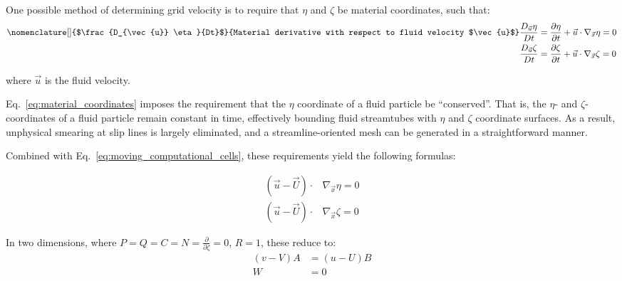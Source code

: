 \documentclass[12pt,letterpaper]{article}
\begin{document}

One possible method of determining grid velocity is to require that
$\eta$ and $\zeta$ be material coordinates, such that:
\begin{align}
\nomenclature[]{$\frac{D_{\vec{u}} \eta}{Dt}$}{Material derivative with
  respect to fluid velocity $\vec{u}$}
\label{eq:material_coordinates}
\frac{D_{\vec{u}} \eta}{Dt}&=\frac{\partial \eta} {\partial t} +
\vec{u}\cdot\nabla_{\vec{x}}\eta
=0
\\
\frac{D_{\vec{u}} \zeta}{Dt}&=\frac{\partial \zeta} {\partial t} +
\vec{u}\cdot\nabla_{\vec{x}}\zeta
=0
\end{align}

\noindent where $\vec{u}$ is the fluid
velocity. 

Eq.~\ref{eq:material_coordinates} imposes the requirement
that the $\eta$ coordinate of a fluid particle be ``conserved''. That
is, the $\eta$- and $\zeta$-coordinates of a fluid particle remain constant
in time, effectively bounding fluid streamtubes with $\eta$ and
$\zeta$ coordinate surfaces. As a result, unphysical
smearing at slip lines is largely eliminated, and a
streamline-oriented mesh can be generated in a straightforward
manner. 

Combined with Eq.~\ref{eq:moving_computational_cells}, these
requirements yield the following formulas:

\begin{align}
\label{eq:material_coordinate_relations}
\left(\vec{u}-\vec{U}\right)\cdot& \nabla_{\vec{x}}\eta=0\\
\left(\vec{u}-\vec{U}\right)\cdot& \nabla_{\vec{x}}\zeta=0
\end{align}

In two dimensions, where $P=Q=C=N=\frac{\partial}{\partial \zeta}=0$, 
$R=1$, these reduce to:
\begin{align}
\label{eq:material_coordinate_relations_2d}
\left(v-V\right)A&=\left(u-U\right)B\\
W&=0
\end{align}
\end{document}
